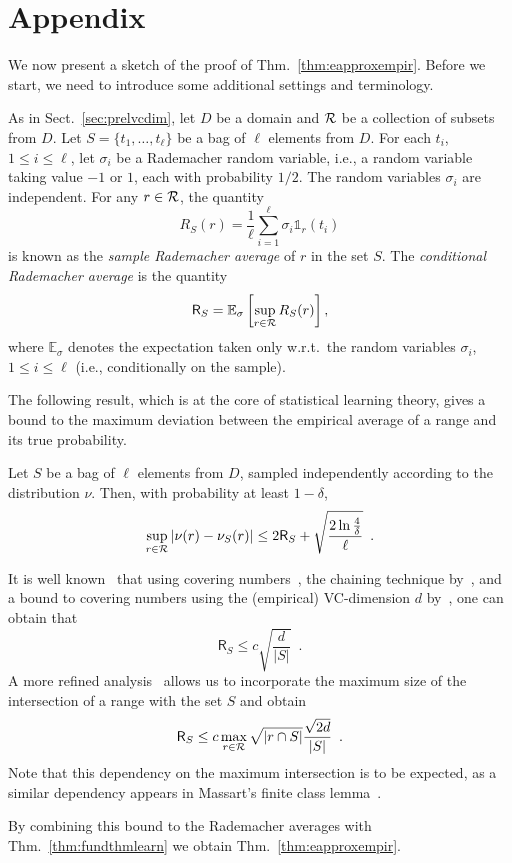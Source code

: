 \appendix
\section{Appendix}
We now present a sketch of the proof of Thm.~\ref{thm:eapproxempir}. Before we start, we
need to introduce some additional settings and terminology.

As in Sect.~\ref{sec:prelvcdim}, let $D$ be a domain and $\mathcal{R}$ be a
collection of subsets from $D$. Let $S=\{t_1,\dotsc,t_\ell\}$ be a bag of $\ell$
elements from $D$. For each $t_i$, $1\le i\le \ell$, let $\sigma_i$ be a
Rademacher random variable, i.e., a random variable taking value $-1$ or $1$,
each with probability $1/2$. The random variables $\sigma_i$ are independent.
For any $r\in\mathcal{R}$, the quantity
\[
	R_S(r)=\frac{1}{\ell}\sum_{i=1}^\ell \sigma_i\mathds{1}_r(t_i)
\]
is known as the \emph{sample Rademacher average} of $r$ in the set $S$. The
\emph{conditional Rademacher average} is the quantity
\[
	\mathsf{R}_S=\mathbb{E}_\sigma\left[\sup_{r\in\mathcal{R}}R_S(r)\right],
\]
where $\mathbb{E}_\sigma$ denotes the expectation taken only w.r.t.~the random
variables $\sigma_i$, $1\le i\le\ell$ (i.e., conditionally on the sample).

The following result, which is at the core of statistical learning theory, gives
a bound to the maximum deviation between the empirical average of a range and
its true probability.

\begin{theorem}\label{thm:fundthmlearn}
	Let $S$ be a bag of $\ell$ elements from $D$, sampled independently
	according to the distribution $\nu$.  Then, with probability at least
	$1-\delta$,
	\[
		\sup_{r\in\mathcal{R}}|\nu(r)-\nu_S(r)|\le 2 \mathsf{R}_S
		+\sqrt{\frac{2\ln\frac{4}{\delta}}{\ell}}\enspace.
	\]
\end{theorem}

It is well known~\citep[Sect.~1.4.6]{Lugosi02} that using covering
numbers~\citep{AnthonyB99}, the chaining technique by~\citet{Dudley84}, and a
bound to covering numbers using the (empirical) VC-dimension $d$
by~\citet{Haussler95}, one can obtain that
\[
	\mathsf{R}_S\le c\sqrt{\frac{d}{|S|}}\enspace.
\]
A more refined analysis~\citep{SridharanTR} allows us to incorporate the maximum
size of the intersection of a range with the set $S$ and obtain
\[
	\mathsf{R}_S\le c\max_{r\in\mathcal{R}}\sqrt{|r\cap
	S|}\frac{\sqrt{2d}}{|S|}\enspace.
\]
Note that this dependency on the maximum intersection is to be expected, as a
similar dependency appears in Massart's finite class lemma~\citep[Lemma
26.8]{ShalevSBD14}.

By combining this bound to the Rademacher averages with
Thm.~\ref{thm:fundthmlearn} we obtain Thm.~\ref{thm:eapproxempir}.
